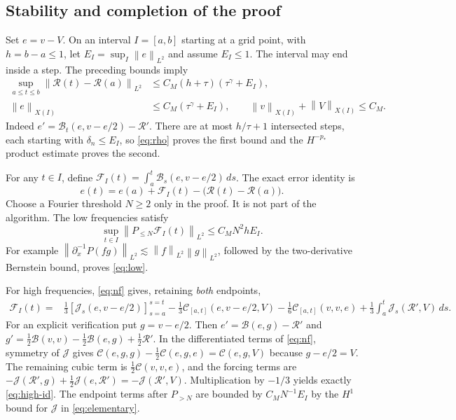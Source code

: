 \documentclass[11pt]{article}
\theoremstyle{remark}\newtheorem{remark}[theorem]{Remark}
\newcommand{\cR}{\mathcal R}
\newcommand{\cC}{\mathcal C}
\newcommand{\cJ}{\mathcal J}
\newcommand{\cB}{\mathcal B}
\newcommand{\norm}[2][]{\left\lVert #2\right\rVert_{#1}}
\begin{document}
\subsection{Stability and completion of the proof}\label{sec:closure}
Set $e=v-V$. On an interval $I=[a,b]$ starting at a grid point, with
$h=b-a\leq1$, let $E_I=\sup_I\norm[L^2]{e}$ and assume $E_I\leq1$.
The interval may end inside a step. The preceding bounds imply
\begin{align}
\sup_{a\leq t\leq b}\norm[L^2]{\cR(t)-\cR(a)}
&\leq C_M(h+\tau)(\tau^\gamma+E_I),\label{eq:Rincrement}\\
\norm[X(I)]{e}&\leq C_M(\tau^\gamma+E_I),\qquad
\norm[X(I)]{v}+\norm[X(I)]{V}\leq C_M.\label{eq:eX}
\end{align}
Indeed $e'=\cB_t(e,v-e/2)-\cR'$. There are at most $h/\tau+1$ intersected
steps, each starting with $\delta_n\leq E_I$, so \eqref{eq:rho} proves the first
bound and the $H^{-p_*}$ product estimate proves the second.

For any $t\in I$, define
$\mathcal F_I(t)=\int_a^t\cB_s(e,v-e/2)\,ds$.
The exact error identity is
\begin{equation}\label{eq:error}
e(t)=e(a)+\mathcal F_I(t)-\bigl(\cR(t)-\cR(a)\bigr).
\end{equation}
Choose a Fourier threshold $N\geq2$ only in the proof. It is not part of the
algorithm. The low frequencies satisfy
\begin{equation}\label{eq:low}
\sup_{t\in I}\norm[L^2]{P_{\leq N}\mathcal F_I(t)}\leq C_M N^2hE_I.
\end{equation}
For example $\norm[L^2]{\partial_x^{-1}P(fg)}\lesssim\norm[L^2]{f}\norm[L^2]{g}$,
followed by the two-derivative Bernstein bound, proves \eqref{eq:low}.

For high frequencies, \eqref{eq:nf} gives, retaining \emph{both} endpoints,
\begin{align}
\mathcal F_I(t)
={}&\tfrac13[\cJ_s(e,v-e/2)]_{s=a}^{s=t}
-\tfrac13\cC_{[a,t]}(e,v-e/2,V)
-\tfrac16\cC_{[a,t]}(v,v,e)
+\tfrac13\int_a^t\cJ_s(\cR',V)\,ds.\label{eq:high-id}
\end{align}
For an explicit verification put $g=v-e/2$.
Then $e'=\cB(e,g)-\cR'$ and
$g'=\frac12\cB(v,v)-\frac12\cB(e,g)+\frac12\cR'$.
In the differentiated terms of \eqref{eq:nf}, symmetry of $\cJ$ gives
$\cC(e,g,g)-\frac12\cC(e,g,e)=\cC(e,g,V)$ because $g-e/2=V$.
The remaining cubic term is $\frac12\cC(v,v,e)$, and the forcing terms are
$-\cJ(\cR',g)+\frac12\cJ(e,\cR')=-\cJ(\cR',V)$.
Multiplication by $-1/3$ yields exactly \eqref{eq:high-id}.
The endpoint terms after $P_{>N}$ are bounded by $C_MN^{-1}E_I$ by the
$H^1$ bound for $\cJ$ in \eqref{eq:elementary}.
\end{document}
